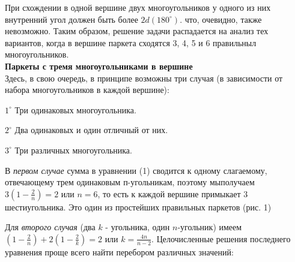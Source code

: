 \thispagestyle{empty}

\setlength{\parindent}{2em}
\setlength{\parskip}{0em}
\setlength{\columnsep}{2em}

\begin{multicols}{2}
\noindent
При схождении в одной вершине двух многоугольников у одного из них внутренний угол должен быть более $2d (180^{\circ})$. что, очевидно, также невозможно. Таким образом, решение задачи распадается на анализ тех вариантов, когда в вершине паркета сходятся 3, 4, 5 и 6 правильныл многоугольников.
\\[3em]
\noindent
\textbf{Паркеты с тремя многоугольниками в вершине}\\
Здесь, в свою очередь, в принципе возможны три случая (в зависимости от набора многоугольников в каждой вершине):

\begin{compactitem}
  \item [$1^{\circ}$] Три одинаковых многоугольника.
  \item [$2^{\circ}$] Два одинаковых и один отличный от них.
  \item [$3^{\circ}$] Три различных многоугольника.
\end{compactitem}

В \textit{первом случае} сумма в уравнении (1) сводится к одному слагаемому, отвечающему трем одинаковым п-угольникам, поэтому мы\linebreak получаем $3(1-\frac{2}{n})=2$ или $n=6$,\linebreak
то есть к каждой вершине примыкает $3$ шестиугольника. Это один из простейших правильных паркетов (рис. 1)

Для \textit{второго случая} (два $k$ - угольника, один $n$-угольник) имеем \linebreak
$(1-\frac{2}{n})+2(1-\frac{2}{k})=2$ или $k=\frac{4n}{n-2}$.\linebreak
Целочисленные решения последнего уравнения проще всего найти перебором различных значений:

\vspace{2em}
\noindent
{}


\end{multicols}
